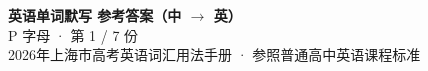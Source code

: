 \documentclass[10pt,a4paper]{article}
\begin{document}
\pagestyle{plain}

\begin{center}
{\LARGE\bfseries 英语单词默写 \quad 参考答案（中 $\to$ 英）}\\[0.22em]
{\large P 字母 · 第 1 / 7 份}\\[0.18em]
{\small 2026年上海市高考英语词汇用法手册 · 参照普通高中英语课程标准}
\end{center}

\vspace{0.2em}
\noindent{\color{rulegray}\rule{\textwidth}{0.8pt}}

\vspace{0.35em}

\vspace{0.25em}
\renewcommand{\arraystretch}{1.32}
\end{document}
